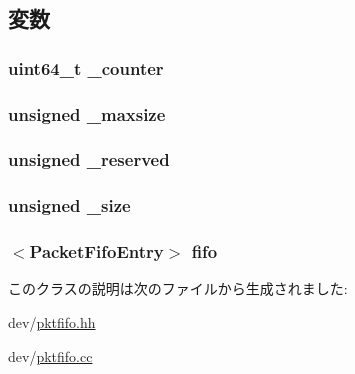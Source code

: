 \subsection{変数}
\hypertarget{classPacketFifo_a0d911bb41364beca3cfb3bce20559fbd}{
\subsubsection[{\_\-counter}]{\setlength{\rightskip}{0pt plus 5cm}uint64\_\-t {\bf \_\-counter}}}
\label{classPacketFifo_a0d911bb41364beca3cfb3bce20559fbd}
\hypertarget{classPacketFifo_aef977b2307374955129483eb55b7305e}{
\subsubsection[{\_\-maxsize}]{\setlength{\rightskip}{0pt plus 5cm}unsigned {\bf \_\-maxsize}}}
\label{classPacketFifo_aef977b2307374955129483eb55b7305e}
\hypertarget{classPacketFifo_a9efa33fafbebfe72d86669a676327b51}{
\subsubsection[{\_\-reserved}]{\setlength{\rightskip}{0pt plus 5cm}unsigned {\bf \_\-reserved}}}
\label{classPacketFifo_a9efa33fafbebfe72d86669a676327b51}
\hypertarget{classPacketFifo_a01c5535abb79f8abf8dc2658d7f768c7}{
\subsubsection[{\_\-size}]{\setlength{\rightskip}{0pt plus 5cm}unsigned {\bf \_\-size}}}
\label{classPacketFifo_a01c5535abb79f8abf8dc2658d7f768c7}
\hypertarget{classPacketFifo_a601f062a64a1985e834a57412003b514}{
\subsubsection[{fifo}]{$<${\bf PacketFifoEntry}$>$ {\bf fifo}}}
\label{classPacketFifo_a601f062a64a1985e834a57412003b514}


このクラスの説明は次のファイルから生成されました:\begin{DoxyCompactItemize}
\item 
dev/\hyperlink{pktfifo_8hh}{pktfifo.hh}\item 
dev/\hyperlink{pktfifo_8cc}{pktfifo.cc}\end{DoxyCompactItemize}
